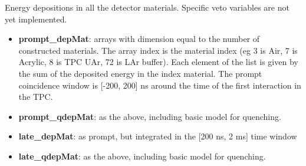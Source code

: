 \documentclass[twocolumn, 10pt]{article}
\begin{document}
Energy depositions in all the detector materials. Specific veto variables are not yet implemented. 
\begin{itemize}
\item {\bf{prompt\_depMat}}:  arrays with dimension equal to the number of constructed materials. The array index is the material index (eg 3 is Air, 7 is Acrylic, 8 is TPC UAr, 72 is LAr buffer). Each element of the list is given by the sum of the deposited energy in the index material. The prompt coincidence window is [-200, 200] ns around the time of the first interaction in the TPC. 
\item {\bf{prompt\_qdepMat}}: as the above, including basic model for quenching. 
\item {\bf{late\_depMat}}:   as prompt, but integrated in the [200 ns, 2 ms] time window 
\item {\bf{late\_qdepMat}}:  as the above, including basic model for quenching. 
\end{itemize}
\end{document}
